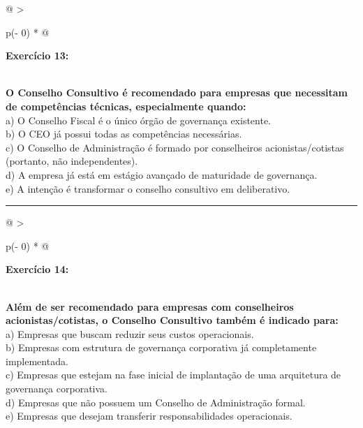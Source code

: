 \documentclass[
]{book}
\begin{document}
\begin{longtable}[]{@{}
  >{\raggedright\arraybackslash}p{(\columnwidth - 0\tabcolsep) * }@{}}
\toprule\noalign{}
\begin{minipage}[b]{\linewidth}\raggedright
\textbf{Exercício 13:}
\end{minipage} \\
\midrule\noalign{}
\endhead
\bottomrule\noalign{}
\endlastfoot
\textbf{O Conselho Consultivo é recomendado para empresas que necessitam de competências técnicas, especialmente quando:} \\
a) O Conselho Fiscal é o único órgão de governança existente. \\
b) O CEO já possui todas as competências necessárias. \\
c) O Conselho de Administração é formado por conselheiros acionistas/cotistas (portanto, não independentes). \\
d) A empresa já está em estágio avançado de maturidade de governança. \\
e) A intenção é transformar o conselho consultivo em deliberativo. \\
\end{longtable}

\begin{center}\rule{0.5\linewidth}{0.5pt}\end{center}

\begin{longtable}[]{@{}
  >{\raggedright\arraybackslash}p{(\columnwidth - 0\tabcolsep) * }@{}}
\toprule\noalign{}
\begin{minipage}[b]{\linewidth}\raggedright
\textbf{Exercício 14:}
\end{minipage} \\
\midrule\noalign{}
\endhead
\bottomrule\noalign{}
\endlastfoot
\textbf{Além de ser recomendado para empresas com conselheiros acionistas/cotistas, o Conselho Consultivo também é indicado para:} \\
a) Empresas que buscam reduzir seus custos operacionais. \\
b) Empresas com estrutura de governança corporativa já completamente implementada. \\
c) Empresas que estejam na fase inicial de implantação de uma arquitetura de governança corporativa. \\
d) Empresas que não possuem um Conselho de Administração formal. \\
e) Empresas que desejam transferir responsabilidades operacionais. \\
\end{longtable}
\end{document}
